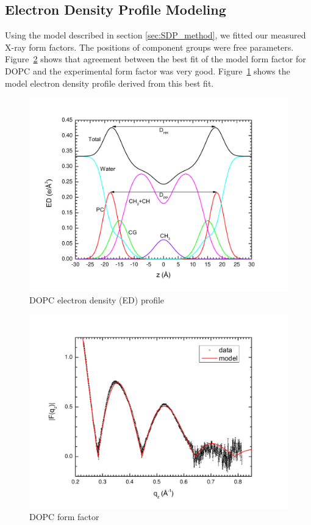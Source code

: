 \subsection{Electron Density Profile Modeling}\label{sec:SDP_results}
Using the model described in section \ref{sec:SDP_method}, 
we fitted our measured X-ray form factors. 
The positions of component groups were free parameters. 
Figure~\ref{fig:DOPC_XFF1} shows that agreement between the best fit of the  
model form factor for DOPC and the experimental form factor was very good. 
Figure~\ref{fig:DOPC_EDP1} shows the model electron density 
profile derived from this best fit.
\begin{figure}[htbp]
  \centering
  \includegraphics[scale=0.3]{./figures/Tat/SDP_Results/DOPC_EDP1.pdf}
  \caption{DOPC electron density (ED) profile}
  \label{fig:DOPC_EDP1}
\end{figure}
\begin{figure}[htbp]
  \centering
  \includegraphics[scale=0.3]{./figures/Tat/SDP_Results/DOPC_XFF1.pdf}
  \caption{DOPC form factor}
  \label{fig:DOPC_XFF1}
\end{figure}

